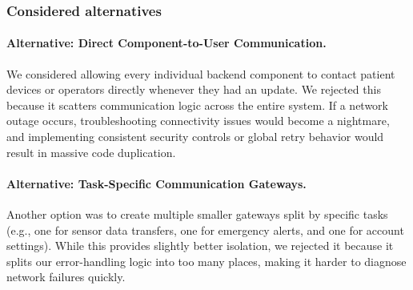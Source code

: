 \subsubsection*{Considered alternatives}
\paragraph{Alternative: Direct Component-to-User Communication.}
We considered allowing every individual backend component to contact patient devices or operators directly whenever they had an update. We rejected this because it scatters communication logic across the entire system. If a network outage occurs, troubleshooting connectivity issues would become a nightmare, and implementing consistent security controls or global retry behavior would result in massive code duplication.

\paragraph{Alternative: Task-Specific Communication Gateways.}
Another option was to create multiple smaller gateways split by specific tasks (e.g., one for sensor data transfers, one for emergency alerts, and one for account settings). While this provides slightly better isolation, we rejected it because it splits our error-handling logic into too many places, making it harder to diagnose network failures quickly.
